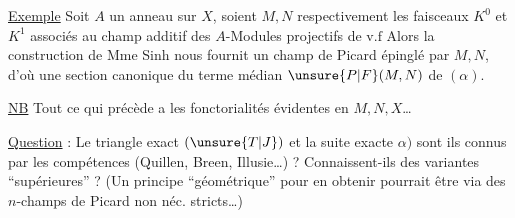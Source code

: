 
\uline{Exemple} Soit $A$ un anneau sur $X$, soient $M,N$ respectivement les faisceaux $K^{0}$ et $K^{1}$ associés au champ additif des $A$-Modules projectifs de $\mathrm{v}.\mathrm{f}$  Alors la construction de Mme Sinh nous fournit un champ de Picard épinglé par $M,N$, d'où une section  canonique du terme médian $\unsure{P|F}(M,N)$ de $(\alpha)$.

\uline{NB} Tout ce qui précède a les fonctorialités évidentes en $M,N,X$\ldots

\uline{Question} : Le triangle exact $(\unsure{T|J})$ et \unsure{-|\phantom{-}} la suite exacte $\alpha)$ sont ils connus par les compétences (Quillen, Breen, Illusie\ldots) ? Connaissent-ils des variantes ``supérieures'' ? (Un principe ``géométrique'' pour en obtenir pourrait être via des $n$-champs de Picard non néc. stricts\ldots)
